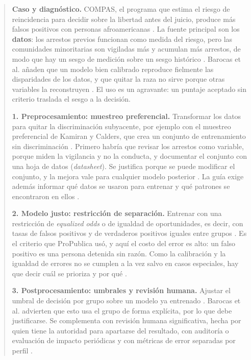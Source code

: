 \documentclass[11pt,letterpaper]{article}
\begin{document}
\begin{quote}
\textbf{Caso y diagnóstico.} COMPAS, el programa que estima el riesgo de reincidencia para decidir sobre la libertad antes del juicio, produce más falsos positivos con personas afroamericanas \parencite{mehrabi2021}. La fuente principal son los \textbf{datos}: los arrestos previos funcionan como medida del riesgo, pero las comunidades minoritarias son vigiladas más y acumulan más arrestos, de modo que hay un sesgo de medición sobre un sesgo histórico \parencite{mehrabi2021}. Barocas et al. añaden que un modelo bien calibrado reproduce fielmente las disparidades de los datos, y que quitar la raza no sirve porque otras variables la reconstruyen \parencite{barocas2023}. El uso es un agravante: un puntaje aceptado sin criterio traslada el sesgo a la decisión.

\textbf{1. Preprocesamiento: muestreo preferencial.} Transformar los datos para quitar la discriminación subyacente, por ejemplo con el muestreo preferencial de Kamiran y Calders, que crea un conjunto de entrenamiento sin discriminación \parencite{mehrabi2021}. Primero habría que revisar los arrestos como variable, porque miden la vigilancia y no la conducta, y documentar el conjunto con una hoja de datos (\textit{datasheet}). Se justifica porque se puede modificar el conjunto, y la mejora vale para cualquier modelo posterior \parencite{barocas2023}. La guía exige además informar qué datos se usaron para entrenar y qué patrones se encontraron en ellos \parencite{mites2022}.

\textbf{2. Modelo justo: restricción de separación.} Entrenar con una restricción de \textit{equalized odds} o de igualdad de oportunidades, es decir, con tasas de falsos positivos y de verdaderos positivos iguales entre grupos \parencite{mehrabi2021}. Es el criterio que ProPublica usó, y aquí el costo del error es alto: un falso positivo es una persona detenida sin razón. Como la calibración y la igualdad de errores no se cumplen a la vez salvo en casos especiales, hay que decir cuál se prioriza y por qué \parencite{mehrabi2021,barocas2023}.

\textbf{3. Postprocesamiento: umbrales y revisión humana.} Ajustar el umbral de decisión por grupo sobre un modelo ya entrenado \parencite{barocas2023}. Barocas et al. advierten que esto usa el grupo de forma explícita, por lo que debe justificarse. Se complementa con revisión humana significativa, hecha por quien tiene la autoridad para apartarse del resultado, con auditoría o evaluación de impacto periódicas y con métricas de error separadas por perfil \parencite{mites2022}.
\end{quote}
\end{document}
